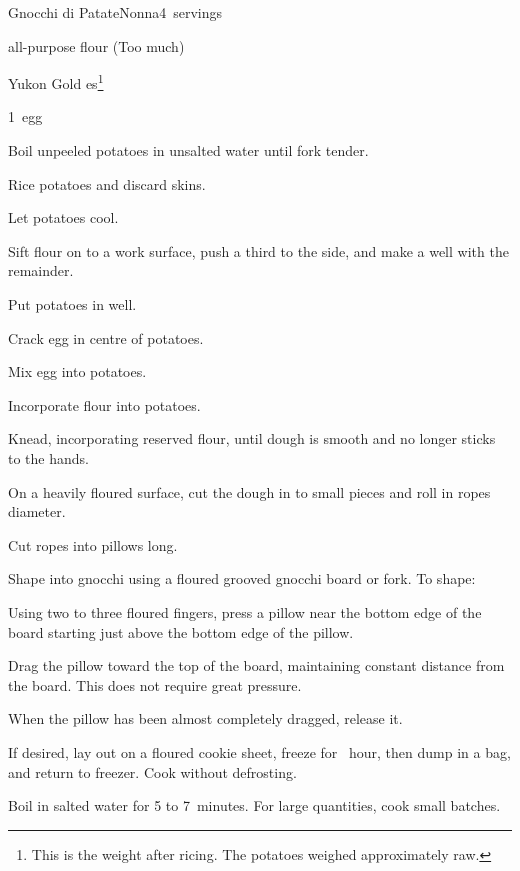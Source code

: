 \begin{recipe}{Gnocchi di Patate\FIXME}{Nonna}{4~servings}

\begin{ingredients}
\item {} all-purpose flour\FIXME{} (Too much)
\item {} Yukon Gold es\footnote{This is the weight after ricing. The potatoes weighed approximately  raw.}
\item 1~egg
\end{ingredients}

\begin{directions}
\item Boil unpeeled potatoes in unsalted water until fork tender.
\item Rice potatoes and discard skins.
\item Let potatoes cool.
\item Sift flour on to a work surface, push a third to the side, and make a well with the remainder.
\item Put potatoes in well.
\item Crack egg in centre of potatoes.
\item Mix egg into potatoes.
\item Incorporate flour into potatoes.
\item Knead, incorporating reserved flour, until dough is smooth and no longer sticks to the hands.
\item On a heavily floured surface, cut the dough in to small pieces and roll in ropes \inch{\threequarter} diameter.
\item Cut ropes into pillows  long. 
\item Shape into gnocchi using a floured grooved gnocchi board or fork. To shape:\par
\begin{enumerate*}
\item Using two to three floured fingers, press a pillow near the bottom edge of the board starting just above the bottom edge of the pillow.
\item Drag the pillow toward the top of the board, maintaining constant distance from the board. This does not require great pressure.
\item When the pillow has been almost completely dragged, release it.
\end{enumerate*}
\item If desired, lay out on a floured cookie sheet, freeze for \half{}~hour, then dump in a bag, and return to freezer. Cook without defrosting.
\item Boil in salted water for 5 to 7~minutes. For large quantities, cook small batches.
\end{directions}

\end{recipe}
